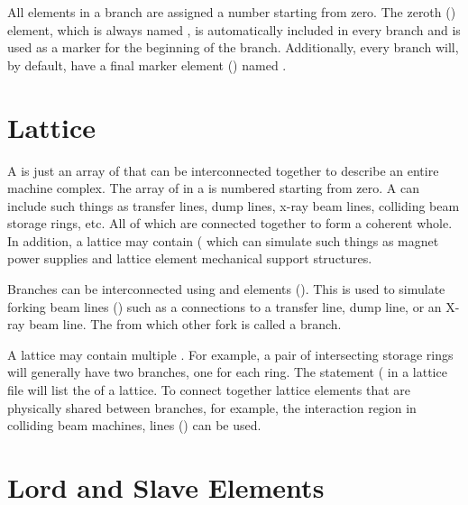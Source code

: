 All elements in a branch are assigned a number starting from zero. The
zeroth  () element, which is always
named , is automatically included in every branch and is
used as a marker for the beginning of the branch.  Additionally, every
branch will, by default, have a final marker element ()
named .

\section{Lattice}
\label{s:lattice.def}

A  is just an array of  that can be
interconnected together to describe an entire machine complex.  The
array of  in a  is numbered starting from
zero. A  can include such things as transfer lines, dump
lines, x-ray beam lines, colliding beam storage rings, etc. All of
which are connected together to form a coherent whole. In addition, a
lattice may contain  ( which
can simulate such things as magnet power supplies and lattice element
mechanical support structures.

Branches can be interconnected using  and
 elements (). This is used to
simulate forking beam lines () such as a connections
to a transfer line, dump line, or an X-ray beam line. The 
from which other  fork is called a  branch.

A lattice may contain multiple  . For example, a
pair of intersecting storage rings will generally have two 
branches, one for each ring. The  statement ( in a
lattice file will list the   of a lattice. To
connect together lattice elements that are physically shared between
branches, for example, the interaction region in colliding beam
machines,  lines () can be used.

\section{Lord and Slave Elements}
\label{s:lord.slave}

